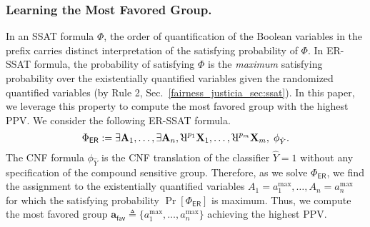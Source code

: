 \subsubsection{Learning the Most Favored Group.}
In an SSAT formula $ \Phi $, the order of quantification of the Boolean variables in the prefix  carries distinct interpretation of the satisfying probability of $ \Phi $.  
In ER-SSAT formula, the probability of satisfying $ \Phi $ is the \textit{maximum} satisfying probability over the existentially quantified variables given the randomized quantified variables (by Rule 2, Sec.~\ref{fairness_justicia_sec:ssat}). 
In this paper, we leverage this property to compute the most favored group with the highest PPV. 
We consider the following ER-SSAT formula. 
\begin{equation}
\Phi_{\mathsf{ER}} := \exists \sensitive_1,\dots, \exists \sensitive_n,
 \R^{p_{1}}\nonsensitive_1, \dots, \R^{p_{m}}\nonsensitive_m,   \; \phi_{\hat{Y}}.
 \label{fairness_justicia_eq:er}
\end{equation}
The CNF formula $\phi_{\hat{Y}}$ is the CNF translation  of the classifier $ \hat{Y} = 1 $ without any specification of the compound sensitive group.  Therefore, as we solve $ \Phi_{\mathsf{ER}} $, we find the assignment to the existentially quantified variables $ A_1 = a^{\max}_1, \dots,A_n = a^{\max}_n $ for which the satisfying probability $ \Pr[\Phi_{\mathsf{ER}}] $ is maximum. 
Thus, we compute  the most favored group $ \mathbf{a}_{\mathsf{fav}} \triangleq \{ a^{\max}_1, \dots, a^{\max}_n \}$ achieving the highest PPV. 



